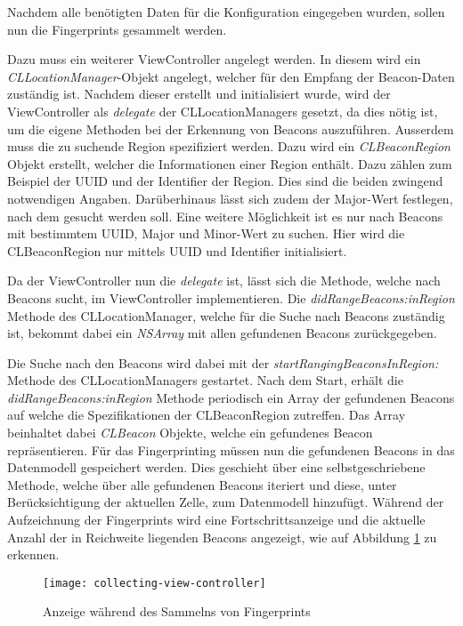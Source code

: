 Nachdem alle benötigten Daten für die Konfiguration eingegeben wurden, sollen nun die Fingerprints gesammelt werden.

Dazu muss ein weiterer ViewController angelegt werden. In diesem wird ein \emph{CLLocationManager}-Objekt angelegt, welcher für den Empfang der Beacon-Daten zuständig ist. Nachdem dieser erstellt und initialisiert wurde, wird der ViewController als \emph{delegate} der CLLocationManagers gesetzt, da dies nötig ist, um die eigene Methoden bei der Erkennung von Beacons auszuführen. Ausserdem muss die zu suchende Region spezifiziert werden. Dazu wird ein \emph{CLBeaconRegion} Objekt erstellt, welcher die Informationen einer Region enthält. Dazu zählen zum Beispiel der UUID und der Identifier der Region. Dies sind die beiden zwingend notwendigen Angaben. Darüberhinaus lässt sich zudem der Major-Wert festlegen, nach dem gesucht werden soll. Eine weitere Möglichkeit ist es nur nach Beacons mit bestimmtem UUID, Major und Minor-Wert zu suchen.
Hier wird die CLBeaconRegion nur mittels UUID und Identifier initialisiert.

Da der ViewController nun die \emph{delegate} ist, lässt sich die Methode, welche nach Beacons sucht, im ViewController implementieren. Die \emph{didRangeBeacons:inRegion} Methode des CLLocationManager, welche für die Suche nach Beacons zuständig ist, bekommt dabei ein \emph{NSArray} mit allen gefundenen Beacons zurückgegeben. 

Die Suche nach den Beacons wird dabei mit der \emph{startRangingBeaconsInRegion:} Methode des CLLocationManagers gestartet.
Nach dem Start, erhält die \emph{didRangeBeacons:inRegion} Methode periodisch ein Array der gefundenen Beacons auf welche die Spezifikationen der CLBeaconRegion zutreffen. 
Das Array beinhaltet dabei \emph{CLBeacon} Objekte, welche ein gefundenes Beacon repräsentieren.
Für das Fingerprinting müssen nun die gefundenen Beacons in das Datenmodell gespeichert werden. Dies geschieht über eine selbstgeschriebene Methode, welche über alle gefundenen Beacons iteriert und diese, unter Berücksichtigung der aktuellen Zelle, zum Datenmodell hinzufügt.
Während der Aufzeichnung der Fingerprints wird eine Fortschrittsanzeige und die aktuelle Anzahl der in Reichweite liegenden Beacons angezeigt, wie auf Abbildung \ref{collecting-view-controller} zu erkennen.

\begin{figure}[htb!]
		\centering
	\texttt{[image: collecting-view-controller]}
	\caption{Anzeige während des Sammelns von Fingerprints}
	\label{collecting-view-controller}
\end{figure}

